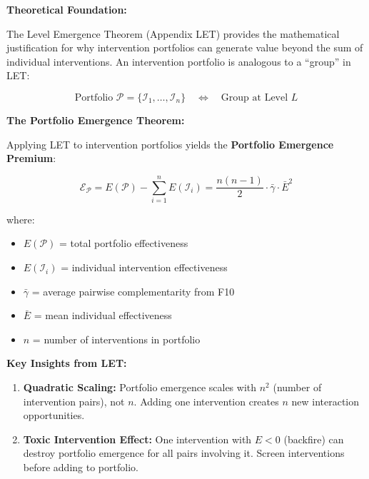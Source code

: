 \begin{tcolorbox}[colback=orange!5!white, colframe=orange!75!black,
    title=Integration: HHH $\leftrightarrow$ FORMAL-LET (IV)]

\textbf{Theoretical Foundation:}

The Level Emergence Theorem (Appendix LET) provides the mathematical justification
for why intervention portfolios can generate value beyond the sum of individual
interventions. An intervention portfolio is analogous to a ``group'' in LET:

\begin{equation}
\text{Portfolio } \mathcal{P} = \{\mathcal{I}_1, \ldots, \mathcal{I}_n\} \quad \Longleftrightarrow \quad \text{Group at Level } L
\end{equation}

\textbf{The Portfolio Emergence Theorem:}

Applying LET to intervention portfolios yields the \textbf{Portfolio Emergence Premium}:

\begin{equation}
\boxed{\mathcal{E}_{\mathcal{P}} = E(\mathcal{P}) - \sum_{i=1}^{n} E(\mathcal{I}_i) = \frac{n(n-1)}{2} \cdot \bar{\gamma} \cdot \bar{E}^2}
\end{equation}

where:
\begin{itemize}[nosep]
\item $E(\mathcal{P})$ = total portfolio effectiveness
\item $E(\mathcal{I}_i)$ = individual intervention effectiveness
\item $\bar{\gamma}$ = average pairwise complementarity from F10
\item $\bar{E}$ = mean individual effectiveness
\item $n$ = number of interventions in portfolio
\end{itemize}

\textbf{Key Insights from LET:}

\begin{enumerate}[nosep]
\item \textbf{Quadratic Scaling:} Portfolio emergence scales with $n^2$ (number of intervention pairs), not $n$. Adding one intervention creates $n$ new interaction opportunities.

\item \textbf{Toxic Intervention Effect:} One intervention with $E < 0$ (backfire) can destroy portfolio emergence for all pairs involving it. Screen interventions before adding to portfolio.


\end{enumerate}
\end{tcolorbox}
